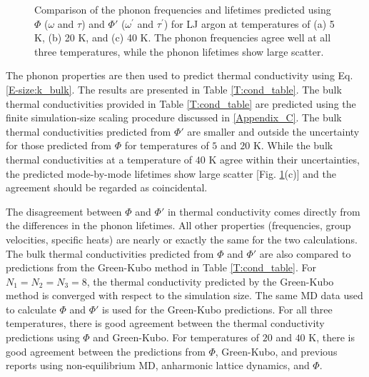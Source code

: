 \documentclass[12pt,twocolumn,iop]{/usr/share/texmf-texlive/tex/latex/iop/iopart}[/usr/share/texmf-texlive/tex/latex/iop/]
\begin{document}
\begin{figure}
\begin{center}
\end{center}
\caption{\label{F:FREQ_LIFE_LJ} Comparison of the phonon frequencies and lifetimes predicted using $\Phi$ ($\omega$ and $\tau$) and $\Phi'$ ($\omega^{'}$ and $\tau^{'}$) for LJ argon at temperatures of (a) 5 K, (b) 20 K, and (c) 40 K. The phonon frequencies agree well at all three temperatures, while the phonon lifetimes show large scatter.}
\end{figure}



The phonon properties are then used to predict thermal conductivity using Eq$.$ \eqref{E-size:k_bulk}. The results are presented in Table \ref{T:cond_table}. The bulk thermal conductivities provided in Table \ref{T:cond_table} are predicted using the finite simulation-size scaling procedure discussed in \ref{Appendix_C}. The bulk thermal conductivities predicted from $\Phi'$ are smaller and outside the uncertainty for those predicted from $\Phi$ for temperatures of $5$ and $20$ K. While the bulk thermal conductivities at a temperature of $40$ K agree within their uncertainties, the predicted mode-by-mode lifetimes show large scatter [Fig$.$ \ref{F:FREQ_LIFE_LJ}(c)] and the agreement should be regarded as coincidental.

The disagreement between $\Phi$ and $\Phi'$ in thermal conductivity comes directly from the differences in the phonon lifetimes. All other properties (frequencies, group velocities, specific heats) are nearly or exactly the same for the two calculations. The bulk thermal conductivities predicted from $\Phi$ and $\Phi'$ are also compared to predictions from the Green-Kubo method\cite{mcquarrie2000} in Table \ref{T:cond_table}. For $N_1=N_2=N_3=8$, the thermal conductivity predicted by the Green-Kubo method is converged with respect to the simulation size.\cite{mcgaughey2004c} The same MD data used to calculate $\Phi$ and $\Phi'$ is used for the Green-Kubo predictions. For all three temperatures, there is good agreement between the thermal conductivity predictions using $\Phi$ and Green-Kubo. For temperatures of $20$ and $40$ K, there is good agreement between the predictions from $\Phi$, Green-Kubo, and previous reports using non-equilibrium MD, anharmonic lattice dynamics, and $\Phi$.\cite{turney2009a}
\end{document}
